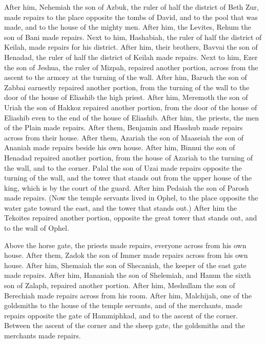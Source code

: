 {After him, Nehemiah the son of Azbuk, the ruler of half the district of Beth Zur, made repairs to the place opposite the tombs of David, and to the pool that was made, and to the house of the mighty men.
After him, the Levites, Rehum the son of Bani made repairs. Next to him, Hashabiah, the ruler of half the district of Keilah, made repairs for his district.
After him, their brothers, Bavvai the son of Henadad, the ruler of half the district of Keilah made repairs.
Next to him, Ezer the son of Jeshua, the ruler of Mizpah, repaired another portion, across from the ascent to the armory at the turning of the wall.
After him, Baruch the son of Zabbai earnestly repaired another portion, from the turning of the wall to the door of the house of Eliashib the high priest.
After him, Meremoth the son of Uriah the son of Hakkoz repaired another portion, from the door of the house of Eliashib even to the end of the house of Eliashib.
After him, the priests, the men of the Plain made repairs.
After them, Benjamin and Hasshub made repairs across from their house. After them, Azariah the son of Maaseiah the son of Ananiah made repairs beside his own house.
After him, Binnui the son of Henadad repaired another portion, from the house of Azariah to the turning of the wall, and to the corner.
Palal the son of Uzai made repairs opposite the turning of the wall, and the tower that stands out from the upper house of the king, which is by the court of the guard. After him Pedaiah the son of Parosh made repairs.
(Now the temple servants lived in Ophel, to the place opposite the water gate toward the east, and the tower that stands out.)
After him the Tekoites repaired another portion, opposite the great tower that stands out, and to the wall of Ophel.
\par }{\PP {}Above the horse gate, the priests made repairs, everyone across from his own house.
After them, Zadok the son of Immer made repairs across from his own house. After him, Shemaiah the son of Shecaniah, the keeper of the east gate made repairs.
After him, Hananiah the son of Shelemiah, and Hanun the sixth son of Zalaph, repaired another portion. After him, Meshullam the son of Berechiah made repairs across from his room.
After him, Malchijah, one of the goldsmiths to the house of the temple servants, and of the merchants, made repairs opposite the gate of Hammiphkad, and to the ascent of the corner.
Between the ascent of the corner and the sheep gate, the goldsmiths and the merchants made repairs.

}
